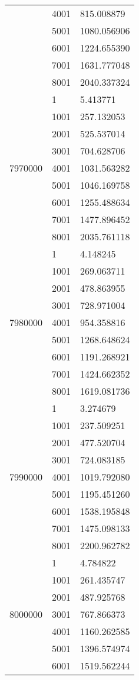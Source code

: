 \begin{table}[htb!]
\begin{tabular}{lll}
 & 4001 & 815.008879 \\
 & 5001 & 1080.056906 \\
 & 6001 & 1224.655390 \\
 & 7001 & 1631.777048 \\
 & 8001 & 2040.337324 \\
\multirow[c]{9}{*}{7970000} & 1 & 5.413771 \\
 & 1001 & 257.132053 \\
 & 2001 & 525.537014 \\
 & 3001 & 704.628706 \\
 & 4001 & 1031.563282 \\
 & 5001 & 1046.169758 \\
 & 6001 & 1255.488634 \\
 & 7001 & 1477.896452 \\
 & 8001 & 2035.761118 \\
\multirow[c]{9}{*}{7980000} & 1 & 4.148245 \\
 & 1001 & 269.063711 \\
 & 2001 & 478.863955 \\
 & 3001 & 728.971004 \\
 & 4001 & 954.358816 \\
 & 5001 & 1268.648624 \\
 & 6001 & 1191.268921 \\
 & 7001 & 1424.662352 \\
 & 8001 & 1619.081736 \\
\multirow[c]{9}{*}{7990000} & 1 & 3.274679 \\
 & 1001 & 237.509251 \\
 & 2001 & 477.520704 \\
 & 3001 & 724.083185 \\
 & 4001 & 1019.792080 \\
 & 5001 & 1195.451260 \\
 & 6001 & 1538.195848 \\
 & 7001 & 1475.098133 \\
 & 8001 & 2200.962782 \\
\multirow[c]{9}{*}{8000000} & 1 & 4.784822 \\
 & 1001 & 261.435747 \\
 & 2001 & 487.925768 \\
 & 3001 & 767.866373 \\
 & 4001 & 1160.262585 \\
 & 5001 & 1396.574974 \\
 & 6001 & 1519.562244 \\

\end{tabular}
\end{table}
